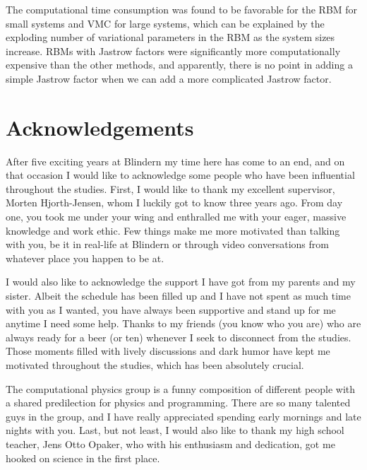 The computational time consumption was found to be favorable for the RBM for small systems and VMC for large systems, which can be explained by the exploding number of variational parameters in the RBM as the system sizes increase. RBMs with Jastrow factors were significantly more computationally expensive than the other methods, and apparently, there is no point in adding a simple Jastrow factor when we can add a more complicated Jastrow factor.

\thispagestyle{empty}
\cleardoublepage

\section*{Acknowledgements}
After five exciting years at Blindern my time here has come to an end, and on that occasion I would like to acknowledge some people who have been influential throughout the studies. First, I would like to thank my excellent supervisor, Morten Hjorth-Jensen, whom I luckily got to know three years ago. From day one, you took me under your wing and enthralled me with your eager, massive knowledge and work ethic. Few things make me more motivated than talking with you, be it in real-life at Blindern or through video conversations from whatever place you happen to be at.

I would also like to acknowledge the support I have got from my parents and my sister. Albeit the schedule has been filled up and I have not spent as much time with you as I wanted, you have always been supportive and stand up for me anytime I need some help. Thanks to my friends (you know who you are) who are always ready for a beer (or ten) whenever I seek to disconnect from the studies. Those moments filled with lively discussions and dark humor have kept me motivated throughout the studies, which has been absolutely crucial.

The computational physics group is a funny composition of different people with a shared predilection for physics and programming. There are so many talented guys in the group, and I have really appreciated spending early mornings and late nights with you. Last, but not least, I would also like to thank my high school teacher, Jens Otto Opaker, who with his enthusiasm and dedication, got me hooked on science in the first place.

    
\thispagestyle{empty}
\cleardoublepage

\newpage

{%
    \tableofcontents
    \thispagestyle{empty}
    \clearpage}%

\thispagestyle{empty}
\clearpage


